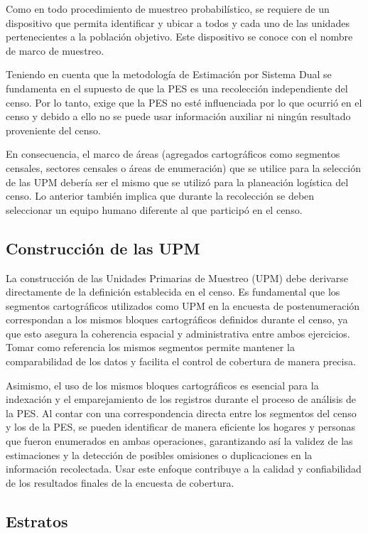 \documentclass[
  12pt,
]{book}
\begin{document}
Como en todo procedimiento de muestreo probabilístico, se requiere de un dispositivo que permita identificar y ubicar a todos y cada uno de las unidades pertenecientes a la población objetivo. Este dispositivo se conoce con el nombre de marco de muestreo.

Teniendo en cuenta que la metodología de Estimación por Sistema Dual se fundamenta en el supuesto de que la PES es una recolección independiente del censo. Por lo tanto, exige que la PES no esté influenciada por lo que ocurrió en el censo y debido a ello no se puede usar información auxiliar ni ningún resultado proveniente del censo.

En consecuencia, el marco de áreas (agregados cartográficos como segmentos censales, sectores censales o áreas de enumeración) que se utilice para la selección de las UPM debería ser el mismo que se utilizó para la planeación logística del censo. Lo anterior también implica que durante la recolección se deben seleccionar un equipo humano diferente al que participó en el censo.

\subsection{Construcción de las UPM}\label{construcciuxf3n-de-las-upm}

La construcción de las Unidades Primarias de Muestreo (UPM) debe derivarse directamente de la definición establecida en el censo. Es fundamental que los segmentos cartográficos utilizados como UPM en la encuesta de postenumeración correspondan a los mismos bloques cartográficos definidos durante el censo, ya que esto asegura la coherencia espacial y administrativa entre ambos ejercicios. Tomar como referencia los mismos segmentos permite mantener la comparabilidad de los datos y facilita el control de cobertura de manera precisa.

Asimismo, el uso de los mismos bloques cartográficos es esencial para la indexación y el emparejamiento de los registros durante el proceso de análisis de la PES. Al contar con una correspondencia directa entre los segmentos del censo y los de la PES, se pueden identificar de manera eficiente los hogares y personas que fueron enumerados en ambas operaciones, garantizando así la validez de las estimaciones y la detección de posibles omisiones o duplicaciones en la información recolectada. Usar este enfoque contribuye a la calidad y confiabilidad de los resultados finales de la encuesta de cobertura.

\subsection{Estratos}\label{estratos}
\end{document}
